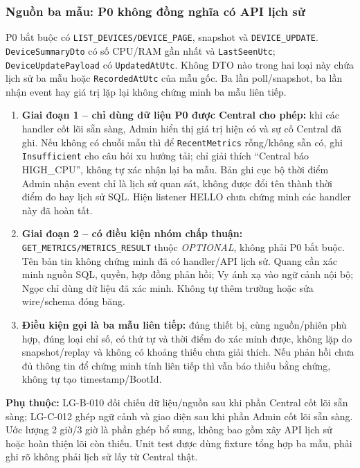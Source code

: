 \documentclass[12pt,a4paper]{article}
\begin{document}
\subsubsection{Nguồn ba mẫu: P0 không đồng nghĩa có API lịch sử}
\label{sec:recentmetrics-roadmap}
P0 bắt buộc có \texttt{LIST\_DEVICES/DEVICE\_PAGE}, snapshot và \texttt{DEVICE\_UPDATE}. \texttt{DeviceSummaryDto} có số CPU/RAM gần nhất và \texttt{LastSeenUtc}; \texttt{DeviceUpdatePayload} có \texttt{UpdatedAtUtc}. Không DTO nào trong hai loại này chứa lịch sử ba mẫu hoặc \texttt{RecordedAtUtc} của mẫu gốc. Ba lần poll/snapshot, ba lần nhận event hay giá trị lặp lại không chứng minh ba mẫu liên tiếp.
\begin{enumerate}
\item \textbf{Giai đoạn 1 -- chỉ dùng dữ liệu P0 được Central cho phép:} khi các handler cốt lõi sẵn sàng, Admin hiển thị giá trị hiện có và sự cố Central đã ghi. Nếu không có chuỗi mẫu thì để \texttt{RecentMetrics} rỗng/không sẵn có, ghi \texttt{Insufficient} cho câu hỏi xu hướng tải; chỉ giải thích ``Central báo HIGH\_CPU'', không tự xác nhận lại ba mẫu. Bản ghi cục bộ thời điểm Admin nhận event chỉ là lịch sử quan sát, không được đổi tên thành thời điểm đo hay lịch sử SQL. Hiện listener HELLO chưa chứng minh các handler này đã hoàn tất.
\item \textbf{Giai đoạn 2 -- có điều kiện nhóm chấp thuận:} \texttt{GET\_METRICS/METRICS\_RESULT} thuộc \emph{OPTIONAL}, không phải P0 bắt buộc. Tên bản tin không chứng minh đã có handler/API lịch sử. Quang cần xác minh nguồn SQL, quyền, hợp đồng phản hồi; Vy ánh xạ vào ngữ cảnh nội bộ; Ngọc chỉ dùng dữ liệu đã xác minh. Không tự thêm trường hoặc sửa wire/schema đóng băng.
\item \textbf{Điều kiện gọi là ba mẫu liên tiếp:} đúng thiết bị, cùng nguồn/phiên phù hợp, đúng loại chỉ số, có thứ tự và thời điểm đo xác minh được, không lặp do snapshot/replay và không có khoảng thiếu chưa giải thích. Nếu phản hồi chưa đủ thông tin để chứng minh tính liên tiếp thì vẫn báo thiếu bằng chứng, không tự tạo timestamp/BootId.
\end{enumerate}
\textbf{Phụ thuộc:} LG-B-010 đối chiếu dữ liệu/nguồn sau khi phần Central cốt lõi sẵn sàng; LG-C-012 ghép ngữ cảnh và giao diện sau khi phần Admin cốt lõi sẵn sàng. Ước lượng 2 giờ/3 giờ là phần ghép bổ sung, không bao gồm xây API lịch sử hoặc hoàn thiện lõi còn thiếu. Unit test được dùng fixture tổng hợp ba mẫu, phải ghi rõ không phải lịch sử lấy từ Central thật.
\end{document}
